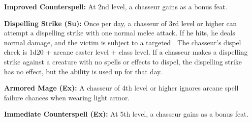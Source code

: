 {%

\textbf{Improved Counterspell:} At 2nd level, a chasseur gains  as a bonus feat.

\textbf{Dispelling Strike (Su):} Once per day, a chasseur of 3rd level or higher can attempt a dispelling strike with one normal melee attack. If he hits, he deals normal damage, and the victim is subject to a targeted . The chasseur's dispel check is 1d20 + arcane caster level + class level. If a chasseur makes a dispelling strike against a creature with no spells or effects to dispel, the dispelling strike has no effect, but the ability is used up for that day.

\textbf{Armored Mage (Ex):} A chasseur of 4th level or higher ignores arcane spell failure chances when wearing light armor.

\textbf{Immediate Counterspell (Ex):} At 5th level, a chasseur gains  as a bonus feat.
}